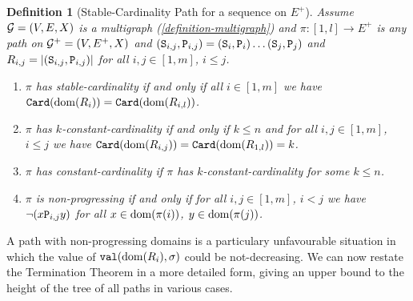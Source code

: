 \documentclass{lmcs}
\newtheorem{definition}[theorem]{Definition}
\begin{document}
\begin{definition}
[Stable-Cardinality Path for a sequence on $E^+$]
Assume ${\mathcal G}=(V,E,X)$ is a multigraph (\ref{definition-multigraph})
and $\pi:[1,l] \rightarrow E^+$ is any path on ${\mathcal G}^+=(V,E^+,X)$
and $({\tt S}_{i,j},{\tt P}_{i,j}) = ({\tt S}_i,{\tt P}_i) \ldots ({\tt S}_j,{\tt P}_j)$
and $R_{i,j} = {| ({\tt S}_{i,j},{\tt P}_{i,j}) |}$
for all $i,j \in[1,m]$, $i \le j$.


\begin{enumerate}

\item
$\pi$ has \emph{stable-cardinality} if and only if all $i \in[1,m]$ 
we have ${\tt Card}({\rm dom}(R_i)) = {\tt Card}({\rm dom}(R_{i,l}))$.

\item
$\pi$ has \emph{$k$-constant-cardinality} if and only if $k \le n$ and for all 
$i,j \in[1,m]$, $i \le j$ 
we have ${\tt Card}({\rm dom}(R_{i,j})) = {\tt Card}({\rm dom}(R_{1,l})) = k$.

\item
$\pi$ has \emph{constant-cardinality} if $\pi$ has $k$-constant-cardinality for some $k \le n$.

\item
$\pi$ is \emph{non-progressing} if and only if for all 
$i, j \in[1,m]$, $i < j$ we have $\neg (x {\tt P}_{i,j} y)$ for all 
$x \in {\rm dom}(\pi(i))$, $y \in {\rm dom}(\pi(j))$.
\end{enumerate}

\end{definition}

A path with non-progressing domains is a particulary unfavourable situation in which the
value of ${\tt val}({\rm dom}(R_i),\sigma)$ could be not-decreasing. 
We can now restate the Termination Theorem in a more detailed form, giving
an upper bound to the height of the tree of all paths in various cases.
 
\end{document}
